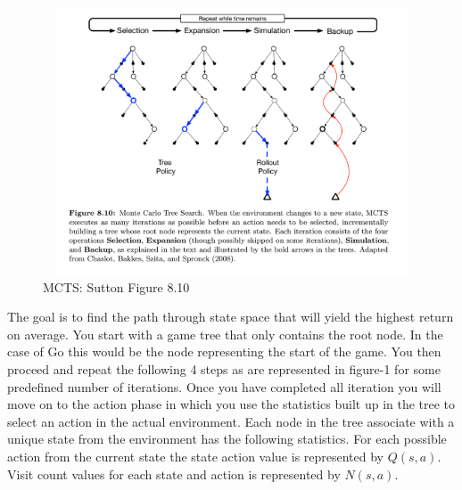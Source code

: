 \begin{figure}[H]
    \centering
    \includegraphics[width=450px,height=300px]{images/mcts}
    \caption{MCTS: Sutton Figure 8.10}
    \label{fig:my_label}
\end{figure}

The goal is to find the path through state space that will yield the highest return on average. You start with a game tree that only contains the root node. In the case of Go this would be the node representing the start of the game. You then proceed and repeat the following 4 steps as are represented in figure-1 for some predefined number of iterations. Once you have completed all iteration you will move on to the action phase in which you use the statistics built up in the tree to select an action in the actual environment. Each node in the tree associate with a unique state from the environment has the following statistics. For each possible action from the current state the state action value is represented by $Q(s,a)$. Visit count values for each state and action is represented by $N(s,a)$.

